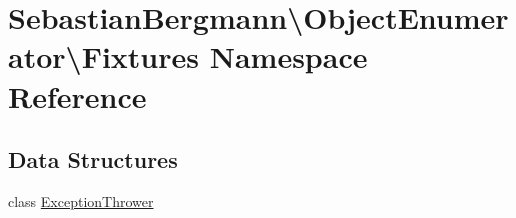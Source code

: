 \hypertarget{namespace_sebastian_bergmann_1_1_object_enumerator_1_1_fixtures}{}\section{Sebastian\+Bergmann\textbackslash{}Object\+Enumerator\textbackslash{}Fixtures Namespace Reference}
\label{namespace_sebastian_bergmann_1_1_object_enumerator_1_1_fixtures}
\subsection*{Data Structures}
\begin{DoxyCompactItemize}
\item 
class \mbox{\hyperlink{class_sebastian_bergmann_1_1_object_enumerator_1_1_fixtures_1_1_exception_thrower}{Exception\+Thrower}}
\end{DoxyCompactItemize}
